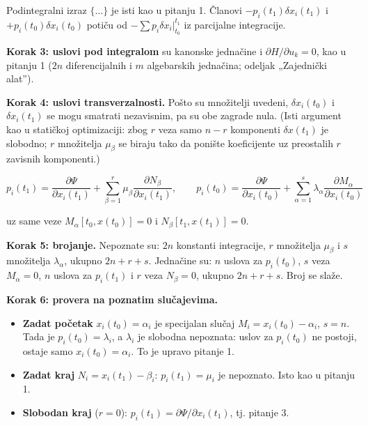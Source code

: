 \documentclass[11pt,a4paper,parskip=half,headsepline,numbers=noenddot]{scrartcl}
\begin{document}
Podintegralni izraz \(\{\dots\}\) je isti kao u pitanju 1. Članovi \(-p_i(t_1)\delta x_i(t_1)\) i \(+p_i(t_0)\delta x_i(t_0)\) potiču od \(-\sum p_i\delta x_i\big|_{t_0}^{t_1}\) iz parcijalne integracije.

\textbf{Korak 3: uslovi pod integralom} su kanonske jednačine i \(\partial H/\partial u_k = 0\), kao u pitanju 1 (\(2n\) diferencijalnih i \(m\) algebarskih jednačina; odeljak „Zajednički alat'').

\textbf{Korak 4: uslovi transverzalnosti.} Pošto su množitelji uvedeni, \(\delta x_i(t_0)\) i \(\delta x_i(t_1)\) se mogu smatrati nezavisnim, pa su obe zagrade nula. (Isti argument kao u statičkoj optimizaciji: zbog \(r\) veza samo \(n - r\) komponenti \(\delta x(t_1)\) je slobodno; \(r\) množitelja \(\mu_\beta\) se biraju tako da ponište koeficijente uz preostalih \(r\) zavisnih komponenti.)

\begin{kljucna}
\[p_i(t_1) = \frac{\partial\Psi}{\partial x_i(t_1)} + \sum_{\beta=1}^r\mu_\beta\frac{\partial N_\beta}{\partial x_i(t_1)}, \qquad p_i(t_0) = \frac{\partial\Psi}{\partial x_i(t_0)} + \sum_{\alpha=1}^s\lambda_\alpha\frac{\partial M_\alpha}{\partial x_i(t_0)}\]

uz same veze \(M_\alpha[t_0, x(t_0)] = 0\) i \(N_\beta[t_1, x(t_1)] = 0\).
\end{kljucna}

\textbf{Korak 5: brojanje.} Nepoznate su: \(2n\) konstanti integracije, \(r\) množitelja \(\mu_\beta\) i \(s\) množitelja \(\lambda_\alpha\), ukupno \(2n + r + s\). Jednačine su: \(n\) uslova za \(p_i(t_0)\), \(s\) veza \(M_\alpha = 0\), \(n\) uslova za \(p_i(t_1)\) i \(r\) veza \(N_\beta = 0\), ukupno \(2n + r + s\). Broj se slaže.

\textbf{Korak 6: provera na poznatim slučajevima.}

\begin{itemize}
\item \textbf{Zadat početak} \(x_i(t_0) = \alpha_i\) je specijalan slučaj \(M_i = x_i(t_0) - \alpha_i\), \(s = n\). Tada je \(p_i(t_0) = \lambda_i\), a \(\lambda_i\) je slobodna nepoznata: uslov za \(p_i(t_0)\) ne postoji, ostaje samo \(x_i(t_0) = \alpha_i\). To je upravo pitanje 1.
\item \textbf{Zadat kraj} \(N_i = x_i(t_1) - \beta_i\): \(p_i(t_1) = \mu_i\) je nepoznato. Isto kao u pitanju 1.
\item \textbf{Slobodan kraj} (\(r = 0\)): \(p_i(t_1) = \partial\Psi/\partial x_i(t_1)\), tj. pitanje 3.
\end{itemize}
\end{document}
